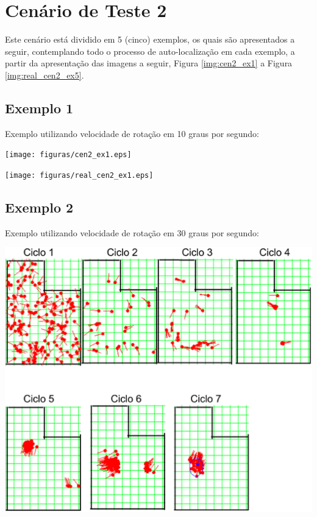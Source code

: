 \section{Cenário de Teste 2}

Este cenário está dividido em 5 (cinco) exemplos, os quais são apresentados a seguir, contemplando todo o processo de auto-localização
em cada exemplo, a partir da apresentação das imagens a seguir, Figura \ref{img:cen2_ex1} a Figura \ref{img:real_cen2_ex5}.

\subsection{Exemplo 1}

Exemplo utilizando velocidade de rotação em 10 graus por segundo:

{\centering
\texttt{[image: figuras/cen2\_ex1.eps]}
\label{img:cen2_ex1}
\par}

{\centering
\texttt{[image: figuras/real\_cen2\_ex1.eps]}
\label{img:real_cen2_ex1}
\par}

\subsection{Exemplo 2}

Exemplo utilizando velocidade de rotação em 30 graus por segundo:

{\centering
\includegraphics[scale=0.4]{figuras/cen2_ex2.eps}
\label{img:cen2_ex2}
\par}

